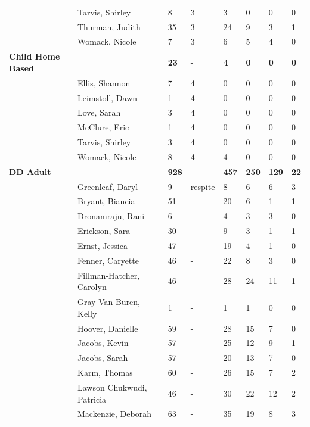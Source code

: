 \documentclass{article}\usepackage[]{graphicx}\usepackage[]{color}
\begin{document}
{\begin{longtable} { >{\raggedright}p{}p{}p{}p{}p{}p{}p{}p{}}
   & Tarvis, Shirley & 8 & 3 & 3 & 0 & 0 & 0 \\ 
   & Thurman, Judith & 35 & 3 & 24 & 9 & 3 & 1 \\ 
   & Womack, Nicole & 7 & 3 & 6 & 5 & 4 & 0 \\ 
   \hline
\textbf{Child Home Based} &  & \textbf{23} & - & \textbf{4} & \textbf{0} & \textbf{0} & \textbf{0} \\ 
   \rowcolor[gray]{0.90} & Ellis, Shannon & 7 & 4 & 0 & 0 & 0 & 0 \\ 
   \rowcolor[gray]{0.90} & Leimstoll, Dawn & 1 & 4 & 0 & 0 & 0 & 0 \\ 
   & Love, Sarah & 3 & 4 & 0 & 0 & 0 & 0 \\ 
   & McClure, Eric & 1 & 4 & 0 & 0 & 0 & 0 \\ 
   & Tarvis, Shirley & 3 & 4 & 0 & 0 & 0 & 0 \\ 
   \rowcolor[gray]{0.90} & Womack, Nicole & 8 & 4 & 4 & 0 & 0 & 0 \\ 
   \hline
\textbf{DD Adult} &  & \textbf{928} & - & \textbf{457} & \textbf{250} & \textbf{129} & \textbf{22} \\ 
   \rowcolor[gray]{0.90} & Greenleaf, Daryl & 9 & respite & 8 & 6 & 6 & 3 \\ 
   & Bryant, Biancia & 51 & - & 20 & 6 & 1 & 1 \\ 
   & Dronamraju, Rani & 6 & - & 4 & 3 & 3 & 0 \\ 
   & Erickson, Sara & 30 & - & 9 & 3 & 1 & 1 \\ 
   \rowcolor[gray]{0.90} & Ernst, Jessica & 47 & - & 19 & 4 & 1 & 0 \\ 
   \rowcolor[gray]{0.90} & Fenner, Caryette & 46 & - & 22 & 8 & 3 & 0 \\ 
   \rowcolor[gray]{0.90} & Fillman-Hatcher, Carolyn & 46 & - & 28 & 24 & 11 & 1 \\ 
   & Gray-Van Buren, Kelly & 1 & - & 1 & 1 & 0 & 0 \\ 
   & Hoover, Danielle & 59 & - & 28 & 15 & 7 & 0 \\ 
   & Jacobs, Kevin & 57 & - & 25 & 12 & 9 & 1 \\ 
   \rowcolor[gray]{0.90} & Jacobs, Sarah & 57 & - & 20 & 13 & 7 & 0 \\ 
   \rowcolor[gray]{0.90} & Karm, Thomas & 60 & - & 26 & 15 & 7 & 2 \\ 
   \rowcolor[gray]{0.90} & Lawson Chukwudi, Patricia & 46 & - & 30 & 22 & 12 & 2 \\ 
   & Mackenzie, Deborah & 63 & - & 35 & 19 & 8 & 3 \\ 

\end{longtable}}
\end{document}
